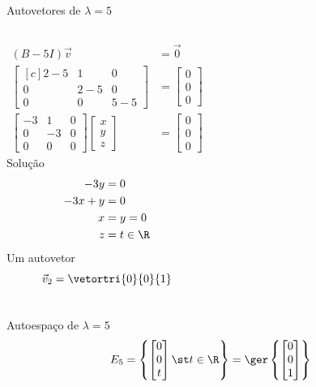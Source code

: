 \begin{resolution}{Autovetores de \(\lambda=5\)}
\begin{columns}
  \begin{align*}
    (B-5I)\vec{v} & = \vec{0}
    \\[1mm]
    \begin{bmatrix}[c]
      2-5 & 1   & 0   \\
      0   & 2-5 & 0   \\
      0   & 0   & 5-5
    \end{bmatrix} & =
    \begin{bmatrix}
      0 \\
      0 \\
      0
    \end{bmatrix}
    \\[3mm]
    \begin{bmatrix}
      -3 & 1  & 0 \\
      0  & -3 & 0 \\
      0  & 0  & 0
    \end{bmatrix}
    \begin{bmatrix}
      x \\
      y \\
      z
    \end{bmatrix}
    & =
    \begin{bmatrix}
      0 \\
      0 \\
      0
    \end{bmatrix}
   \end{align*}
  Solução
  \begin{align*}
    -3y   & = 0     \\
    -3x+y & = 0     \\
    x     & = y = 0 \\
    z     & = t \in \R
  \end{align*}
  Um autovetor
  \[
    \vec{v}_2
    = \vetortri{0}{0}{1}
  \]
\end{columns}
\end{resolution}

\begin{resolution}{Autoespaço de \(\lambda=5\)}
  \[
    E_5
    = \left\{
      \begin{bmatrix}
        0 \\
        0 \\
        t
      \end{bmatrix}
      \st t \in \R
    \right\}
    = \ger\left\{
      \begin{bmatrix}
        0 \\
        0 \\
        1
      \end{bmatrix}
    \right\}
  \]
\end{resolution}

